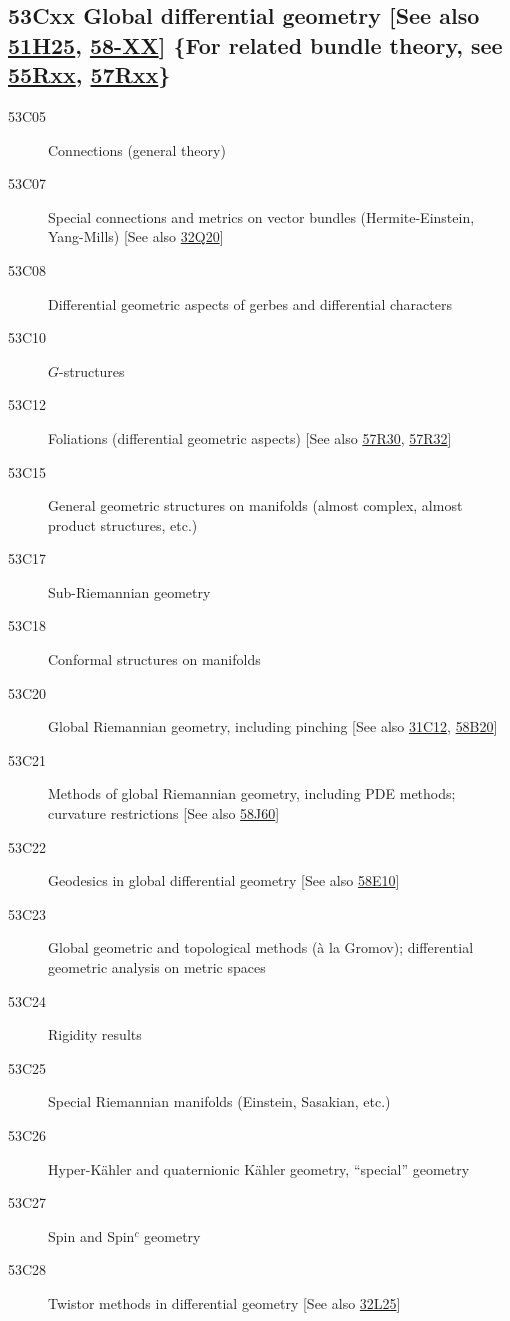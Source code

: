 \subsection*{53Cxx  Global differential geometry [See also \hyperref[51H25]{51H25}, \hyperref[58-XX]{58-XX}] \{For related bundle theory, see \hyperref[55Rxx]{55Rxx}, \hyperref[57Rxx]{57Rxx}\} }\label{53Cxx}
\begin{description}  
\item [53C05]\label{53C05} Connections (general theory)
\item [53C07]\label{53C07} Special connections and metrics on vector bundles (Hermite-Einstein, Yang-Mills) [See also \hyperref[32Q20]{32Q20}]
\item [53C08]\label{53C08} Differential geometric aspects of gerbes and differential characters
\item [53C10]\label{53C10} $G$-structures
\item [53C12]\label{53C12} Foliations (differential geometric aspects) [See also \hyperref[57R30]{57R30}, \hyperref[57R32]{57R32}]
\item [53C15]\label{53C15} General geometric structures on manifolds (almost complex, almost product structures, etc.)
\item [53C17]\label{53C17} Sub-Riemannian geometry
\item [53C18]\label{53C18} Conformal structures on manifolds
\item [53C20]\label{53C20} Global Riemannian geometry, including pinching [See also \hyperref[31C12]{31C12}, \hyperref[58B20]{58B20}]
\item [53C21]\label{53C21} Methods of global  Riemannian geometry, including PDE methods; curvature restrictions [See also \hyperref[58J60]{58J60}]
\item [53C22]\label{53C22} Geodesics in global differential geometry [See also \hyperref[58E10]{58E10}]
\item [53C23]\label{53C23} Global geometric and topological methods (\`{a} la Gromov); differential geometric analysis on metric spaces
\item [53C24]\label{53C24} Rigidity results 
\item [53C25]\label{53C25} Special Riemannian manifolds (Einstein, Sasakian, etc.)
\item [53C26]\label{53C26} Hyper-K\"{a}hler and quaternionic K\"{a}hler geometry, ``special'' geometry
\item [53C27]\label{53C27} Spin and Spin${}^c$ geometry
\item [53C28]\label{53C28} Twistor methods in differential geometry [See also \hyperref[32L25]{32L25}]

\end{description}
